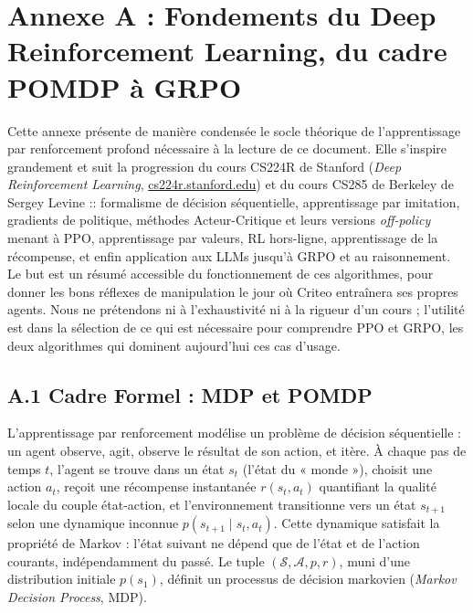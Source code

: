 \documentclass[11pt,a4paper]{article}
\begin{document}
\section{Annexe A : Fondements du Deep Reinforcement Learning, du cadre POMDP à GRPO}
\label{annexe:maths_rl}

Cette annexe présente de manière condensée le socle théorique de l'apprentissage par renforcement profond nécessaire à la lecture de ce document. Elle s'inspire grandement et suit la progression du cours CS224R de Stanford (\emph{Deep Reinforcement Learning}, \href{https://cs224r.stanford.edu/}{cs224r.stanford.edu}) et du cours CS285 de Berkeley de Sergey Levine :: formalisme de décision séquentielle, apprentissage par imitation, gradients de politique, méthodes Acteur-Critique et leurs versions \emph{off-policy} menant à PPO, apprentissage par valeurs, RL hors-ligne, apprentissage de la récompense, et enfin application aux LLMs jusqu'à GRPO et au raisonnement. Le but est un résumé accessible du fonctionnement de ces algorithmes, pour donner les bons réflexes de manipulation le jour où Criteo entraînera ses propres agents. Nous ne prétendons ni à l'exhaustivité ni à la rigueur d'un cours ; l'utilité est dans la sélection de ce qui est nécessaire pour comprendre PPO et GRPO, les deux algorithmes qui dominent aujourd'hui ces cas d'usage.


\subsection*{A.1 Cadre Formel : MDP et POMDP}
L'apprentissage par renforcement modélise un problème de décision séquentielle : un agent observe, agit, observe le résultat de son action, et itère. À chaque pas de temps $t$, l'agent se trouve dans un état $s_t$ (l'état du « monde »), choisit une action $a_t$, reçoit une récompense instantanée $r(s_t, a_t)$ quantifiant la qualité locale du couple état-action, et l'environnement transitionne vers un état $s_{t+1}$ selon une dynamique inconnue $p(s_{t+1} \mid s_t, a_t)$. Cette dynamique satisfait la propriété de Markov : l'état suivant ne dépend que de l'état et de l'action courants, indépendamment du passé. Le tuple $(\mathcal{S}, \mathcal{A}, p, r)$, muni d'une distribution initiale $p(s_1)$, définit un processus de décision markovien (\emph{Markov Decision Process}, MDP).
\end{document}
